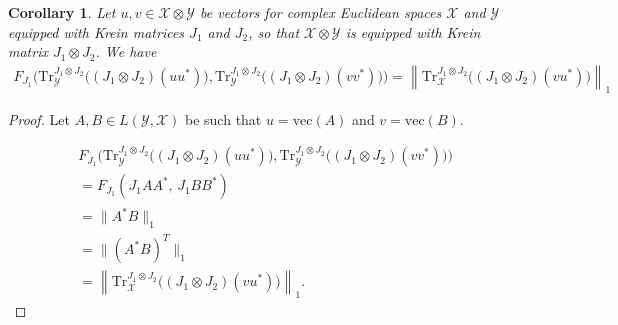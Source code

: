 \documentclass{amsart}
\numberwithin{equation}{section}
\newtheorem{corollary}[theorem]{Corollary}
\theoremstyle{definition}
\theoremstyle{plain}
\theoremstyle{solutionstyle}
\begin{document}
\begin{corollary}
Let $u, v \in \mathcal{X} \otimes \mathcal{Y}$ be vectors for complex Euclidean spaces $\mathcal{X}$ and $\mathcal{Y}$ equipped with Krein matrices $J_1$ and $J_2$, so that $\mathcal{X} \otimes \mathcal{Y}$ is equipped with Krein matrix $J_1 \otimes J_2$. We have
\begin{align*}
F_{J_1}\Big(
\mathrm{Tr}_{\mathcal{Y}}^{J_1 \otimes J_2}\big((J_1 \otimes J_2)(uu^*)\big),
\mathrm{Tr}_{\mathcal{Y}}^{J_1 \otimes J_2}\big((J_1 \otimes J_2)(vv^*)\big)
\Big)=\left\|\mathrm{Tr}_{\mathcal{X}}^{J_1 \otimes J_2}\big((J_1 \otimes J_2)(v u^*)\big)\right\|_1
\end{align*}
\end{corollary}

\begin{proof}
Let $A,B \in L(\mathcal{Y},\mathcal{X})$ be such that $u=\mathrm{vec}(A)$ and $v=\mathrm{vec}(B)$.

\begin{align*}
&F_{J_1}\Big(
\mathrm{Tr}_{\mathcal{Y}}^{J_1 \otimes J_2}\big((J_1 \otimes J_2)(uu^*)\big),
\mathrm{Tr}_{\mathcal{Y}}^{J_1 \otimes J_2}\big((J_1 \otimes J_2)(vv^*)\big)
\Big) \\
&= F_{J_1}(J_1 A A^*,\, J_1 B B^*) \\
&= \|A^* B\|_1 \\
&= \|(A^* B)^T\|_1 \\
&= \left\|\mathrm{Tr}_{\mathcal{X}}^{J_1 \otimes J_2}\big((J_1 \otimes J_2)(v u^*)\big)\right\|_1.
\end{align*}
\end{proof}
\end{document}
